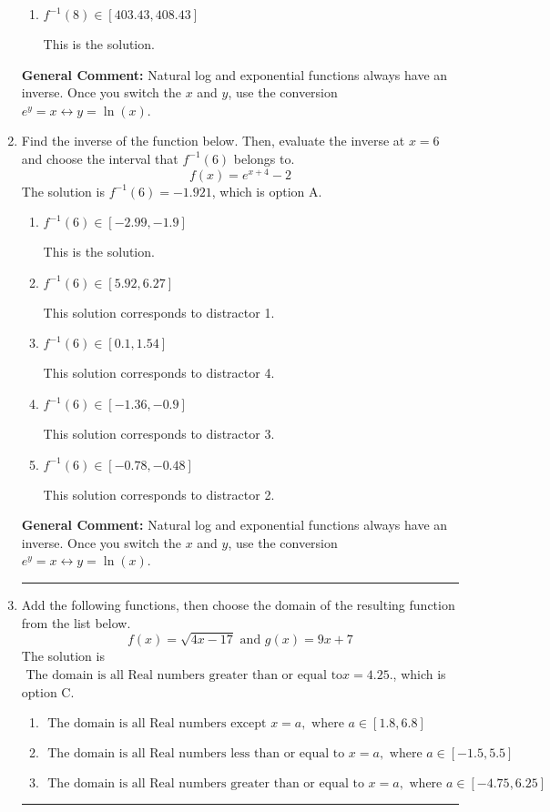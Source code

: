 \documentclass{extbook}[14pt]
\newcommand{\litem}[1]{\item #1

\rule{\textwidth}{0.4pt}}
\begin{document}
\begin{enumerate}
{\begin{enumerate}[label=\Alph*.]
 This solution corresponds to distractor 2.
\item \( f^{-1}(8) \in [403.43, 408.43] \)

 This is the solution.
\end{enumerate}

\textbf{General Comment:} Natural log and exponential functions always have an inverse. Once you switch the $x$ and $y$, use the conversion $ e^y = x \leftrightarrow y=\ln(x)$.
}
\litem{
Find the inverse of the function below. Then, evaluate the inverse at $x = 6$ and choose the interval that $f^{-1}(6)$ belongs to.
\[ f(x) = e^{x+4}-2 \]The solution is \( f^{-1}(6) = -1.921 \), which is option A.\begin{enumerate}[label=\Alph*.]
\item \( f^{-1}(6) \in [-2.99, -1.9] \)

 This is the solution.
\item \( f^{-1}(6) \in [5.92, 6.27] \)

 This solution corresponds to distractor 1.
\item \( f^{-1}(6) \in [0.1, 1.54] \)

 This solution corresponds to distractor 4.
\item \( f^{-1}(6) \in [-1.36, -0.9] \)

 This solution corresponds to distractor 3.
\item \( f^{-1}(6) \in [-0.78, -0.48] \)

 This solution corresponds to distractor 2.
\end{enumerate}

\textbf{General Comment:} Natural log and exponential functions always have an inverse. Once you switch the $x$ and $y$, use the conversion $ e^y = x \leftrightarrow y=\ln(x)$.
}
\litem{
Add the following functions, then choose the domain of the resulting function from the list below.
\[ f(x) = \sqrt{4x-17}  \text{ and } g(x) = 9x + 7 \]The solution is \( \text{ The domain is all Real numbers greater than or equal to} x = 4.25. \), which is option C.\begin{enumerate}[label=\Alph*.]
\item \( \text{ The domain is all Real numbers except } x = a, \text{ where } a \in [1.8, 6.8] \)


\item \( \text{ The domain is all Real numbers less than or equal to } x = a, \text{ where } a \in [-1.5, 5.5] \)


\item \( \text{ The domain is all Real numbers greater than or equal to } x = a, \text{ where } a \in [-4.75, 6.25] \)



\end{enumerate}}
\end{enumerate}
\end{document}
